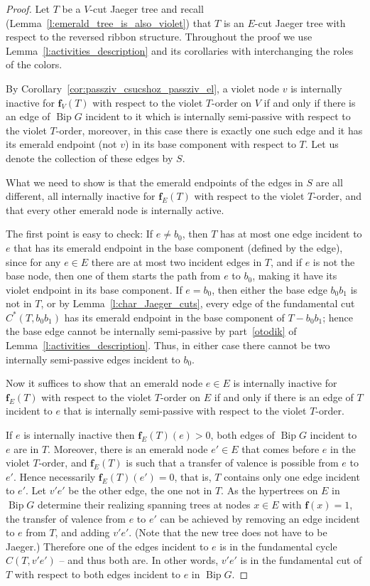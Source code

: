 \documentclass[10pt]{amsart}
\theoremstyle{definition}\newtheorem{defi}[theo]{Definition}
\theoremstyle{remark}\newtheorem{rema}[theo]{Remark}
\DeclareMathOperator{\bip}{Bip}
\begin{document}
\begin{proof}
Let $T$ be a $V$-cut Jaeger tree and recall (Lemma~\ref{l:emerald_tree_is_also_violet}) that $T$ is an $E$-cut Jaeger tree with respect to the reversed ribbon structure. Throughout the proof we use Lemma~\ref{l:activities_description} and its corollaries with interchanging the roles of the colors. 

By Corollary~\ref{cor:passziv_csucshoz_passziv_el}, a violet node $v$ is internally inactive for $\mathbf f_V(T)$ with respect to the violet $T$-order on $V$ if and only if there is an edge of $\bip G$ incident to it which is internally semi-passive with respect to the violet $T$-order, moreover, in this case there is exactly one such edge and it has its emerald endpoint (not $v$) in its base component with respect to $T$. Let us denote the collection of these edges by $S$.

What we need to show is that the emerald endpoints of the edges in $S$ are all different, all internally inactive for $\mathbf f_E(T)$ with respect to the violet $T$-order, and that every other emerald node is internally active.

The first point is easy to check: If $e\neq b_0$, then $T$ has at most one edge incident to $e$ that has its emerald endpoint in the base component (defined by the edge), since for any $e\in E$ there are at most two incident edges in $T$, and if $e$ is not the base node, then one of them starts the path from $e$ to $b_0$, making it have its violet endpoint in its base component. If $e=b_0$, then either the base edge $b_0b_1$ is not in $T$, or by Lemma~\ref{l:char_Jaeger_cuts}, every edge of the fundamental cut $C^*(T,b_0b_1)$ has its emerald endpoint in the base component of $T-b_0b_1$; hence the base edge cannot be internally semi-passive by part~\ref{otodik} of Lemma~\ref{l:activities_description}. Thus, in either case there cannot be two internally semi-passive edges incident to $b_0$.

Now it suffices to show that an emerald node $e\in E$ is internally inactive for $\mathbf f_E(T)$ with respect to the violet $T$-order on $E$ if and only if there is an edge of $T$ incident to $e$ that is internally semi-passive with respect to the violet $T$-order. 

If $e$ is internally inactive then $\mathbf f_E(T)(e)>0$, \ie both edges of $\bip G$ incident to $e$ are in $T$. Moreover, there is an emerald node $e'\in E$ that comes before $e$ in the violet $T$-order, and $\mathbf f_E(T)$ is such that a transfer of valence is possible from $e$ to $e'$. Hence necessarily $\mathbf f_E(T)(e')=0$, that is, $T$ contains only one edge incident to $e'$. Let $v'e'$ be the other edge, the one not in $T$. As the hypertrees on $E$ in $\bip G$ determine their realizing spanning trees at nodes $x\in E$ with $\mathbf f(x)=1$, the transfer of valence from $e$ to $e'$ can be achieved by removing an edge incident to $e$ from $T$, and adding $v'e'$. (Note that the new tree does not have to be Jaeger.) Therefore one of the edges incident to $e$ is in the fundamental cycle $C(T,v'e')$ -- and thus both are. In other words, $v'e'$ is in the fundamental cut of $T$ with respect to both edges incident to $e$ in $\bip G$.


\end{proof}
\end{document}
